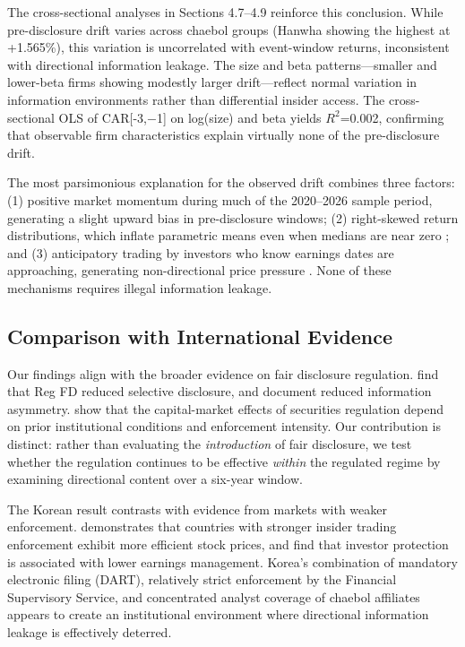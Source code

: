 \documentclass[manuscript,review]{acmart}
\begin{document}
The cross-sectional analyses in Sections 4.7--4.9 reinforce this conclusion. While pre-disclosure drift varies across chaebol groups (Hanwha showing the highest at +1.565\%), this variation is uncorrelated with event-window returns, inconsistent with directional information leakage. The size and beta patterns---smaller and lower-beta firms showing modestly larger drift---reflect normal variation in information environments rather than differential insider access. The cross-sectional OLS of CAR[-3,$-$1] on log(size) and beta yields $R^2$=0.002, confirming that observable firm characteristics explain virtually none of the pre-disclosure drift.

The most parsimonious explanation for the observed drift combines three factors: (1) positive market momentum during much of the 2020--2026 sample period, generating a slight upward bias in pre-disclosure windows; (2) right-skewed return distributions, which inflate parametric means even when medians are near zero \cite{flannery2004partial}; and (3) anticipatory trading by investors who know earnings dates are approaching, generating non-directional price pressure \cite{chae2005trading}. None of these mechanisms requires illegal information leakage.

\subsection{Comparison with International Evidence}

Our findings align with the broader evidence on fair disclosure regulation. \citet{bailey2003regulation} find that Reg FD reduced selective disclosure, and \citet{eleswarapu2004impact} document reduced information asymmetry. \citet{christensen2013capital} show that the capital-market effects of securities regulation depend on prior institutional conditions and enforcement intensity. Our contribution is distinct: rather than evaluating the \textit{introduction} of fair disclosure, we test whether the regulation continues to be effective \textit{within} the regulated regime by examining directional content over a six-year window.

The Korean result contrasts with evidence from markets with weaker enforcement. \citet{beny2005impact} demonstrates that countries with stronger insider trading enforcement exhibit more efficient stock prices, and \citet{leuz2003earnings} find that investor protection is associated with lower earnings management. Korea's combination of mandatory electronic filing (DART), relatively strict enforcement by the Financial Supervisory Service, and concentrated analyst coverage of chaebol affiliates appears to create an institutional environment where directional information leakage is effectively deterred.
\end{document}

